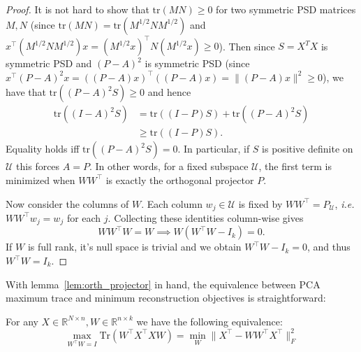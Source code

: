 \documentclass[twoside,11pt]{article}
\begin{document}
\begin{proof}
It is not hard to show that $\mathrm{tr}(MN)\geq 0$ for two symmetric PSD matrices $M,N$ (since $\mathrm{tr}(MN) = \mathrm{tr}(M^{1/2}NM^{1/2})$ and $x^\top (M^{1/2}NM^{1/2})x = (M^{1/2}x)^\top N(M^{1/2}x)\geq 0$). Then since $S = X^TX$ is symmetric PSD and $(P-A)^2$ is symmetric PSD (since $x^\top(P-A)^2x = ((P-A)x)^\top ((P-A)x) = \|(P-A)x\|^2\geq 0$), we have that $\mathrm{tr}((P-A)^2S)\geq 0$ and hence \begin{align*}
\mathrm{tr}((I-A)^2S)
&=
\mathrm{tr}((I-P)S)
+
\mathrm{tr}((P-A)^2S) \\
&\geq
\mathrm{tr}((I-P)S).
\end{align*}
Equality holds iff $\mathrm{tr}((P-A)^2S)=0$. In particular, if $S$ is positive definite on $\mathcal U$ this forces $A=P$. In other words, for a fixed subspace $\mathcal{U}$, the first term is minimized when $WW^\top$ is exactly the orthogonal projector $P$. 

Now consider the columns of $W$. Each column $w_j\in \mathcal{U}$ is fixed by $WW^\top = P_\mathcal{U}$, \emph{i.e.} $WW^\top w_j = w_j$ for each $j$. Collecting these identities column-wise gives 
    \[WW^\top W = W\implies W(W^\top W-I_k) = 0.\]
    If $W$ is full rank, it's null space is trivial and we obtain $W^\top W-I_k = 0$, and thus $W^\top W = I_k$. 

\end{proof}

With lemma~\ref{lem:orth_projector} in hand, the equivalence between PCA maximum trace and minimum reconstruction objectives is straightforward:
\begin{theorem}
    For any $X\in \mathbb{R}^{N\times n}, W\in \mathbb{R}^{n\times k}$ we have the following equivalence:\[\max_{W^\top W = I}  \text{Tr}(W^\top X^\top X W) = \min_W \| X^\top - W W^\top X^\top \|_F^2\]
\end{theorem}
\end{document}
